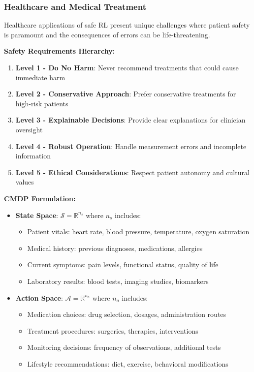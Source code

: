 \documentclass[12pt]{article}
\begin{document}
{{{{\subsubsection{Healthcare and Medical Treatment}

Healthcare applications of safe RL present unique challenges where patient safety is paramount and the consequences of errors can be life-threatening.

\textbf{Safety Requirements Hierarchy:}
\begin{enumerate}
\item \textbf{Level 1 - Do No Harm}: Never recommend treatments that could cause immediate harm
\item \textbf{Level 2 - Conservative Approach}: Prefer conservative treatments for high-risk patients
\item \textbf{Level 3 - Explainable Decisions}: Provide clear explanations for clinician oversight
\item \textbf{Level 4 - Robust Operation}: Handle measurement errors and incomplete information
\item \textbf{Level 5 - Ethical Considerations}: Respect patient autonomy and cultural values
\end{enumerate}

\textbf{CMDP Formulation:}
\begin{itemize}
\item \textbf{State Space}: $\mathcal{S} = \mathbb{R}^{n_s}$ where $n_s$ includes:
\begin{itemize}
\item Patient vitals: heart rate, blood pressure, temperature, oxygen saturation
\item Medical history: previous diagnoses, medications, allergies
\item Current symptoms: pain levels, functional status, quality of life
\item Laboratory results: blood tests, imaging studies, biomarkers
\end{itemize}

\item \textbf{Action Space}: $\mathcal{A} = \mathbb{R}^{n_a}$ where $n_a$ includes:
\begin{itemize}
\item Medication choices: drug selection, dosages, administration routes
\item Treatment procedures: surgeries, therapies, interventions
\item Monitoring decisions: frequency of observations, additional tests
\item Lifestyle recommendations: diet, exercise, behavioral modifications
\end{itemize}


\end{itemize}}}}}
\end{document}

